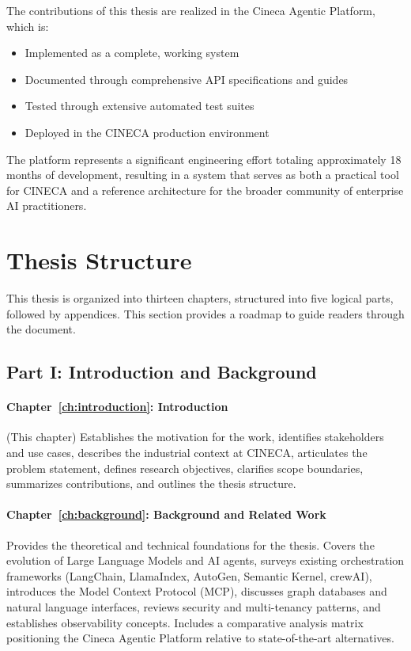 \documentclass[a4paper,twoside]{sapthesis}
\begin{document}
The contributions of this thesis are realized in the Cineca Agentic Platform, which is:
\begin{itemize}
    \item Implemented as a complete, working system
    \item Documented through comprehensive API specifications and guides
    \item Tested through extensive automated test suites
    \item Deployed in the CINECA production environment
\end{itemize}

The platform represents a significant engineering effort totaling approximately 18 months of development, resulting in a system that serves as both a practical tool for CINECA and a reference architecture for the broader community of enterprise AI practitioners.

\section{Thesis Structure}
\label{sec:thesis-structure}

This thesis is organized into thirteen chapters, structured into five logical parts, followed by appendices. This section provides a roadmap to guide readers through the document.

\subsection{Part I: Introduction and Background}

\paragraph{Chapter~\ref{ch:introduction}: Introduction}
(This chapter) Establishes the motivation for the work, identifies stakeholders and use cases, describes the industrial context at CINECA, articulates the problem statement, defines research objectives, clarifies scope boundaries, summarizes contributions, and outlines the thesis structure.

\paragraph{Chapter~\ref{ch:background}: Background and Related Work}
Provides the theoretical and technical foundations for the thesis. Covers the evolution of Large Language Models and AI agents, surveys existing orchestration frameworks (LangChain, LlamaIndex, AutoGen, Semantic Kernel, crewAI), introduces the Model Context Protocol (MCP), discusses graph databases and natural language interfaces, reviews security and multi-tenancy patterns, and establishes observability concepts. Includes a comparative analysis matrix positioning the Cineca Agentic Platform relative to state-of-the-art alternatives.
\end{document}
